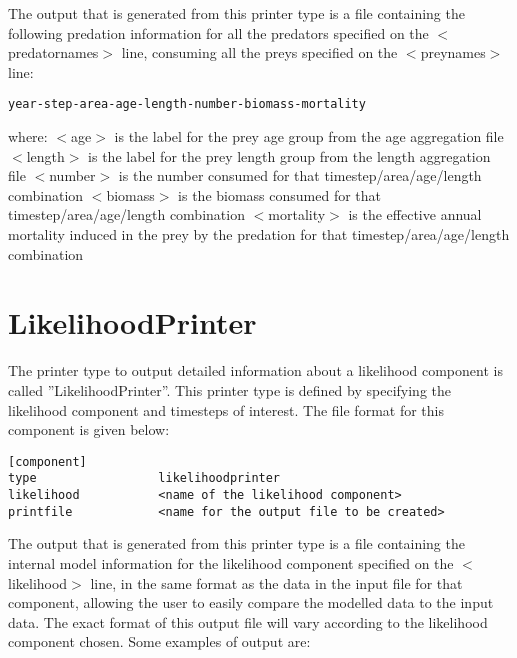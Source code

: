 \documentclass[10pt,twoside]{book}
\begin{document}
\bigskip
The output that is generated from this printer type is a file containing the following predation information for all the predators specified on the $<$predatornames$>$ line, consuming all the preys specified on the $<$preynames$>$ line:

{\small\begin{verbatim}
year-step-area-age-length-number-biomass-mortality
\end{verbatim}}

where:\newline
$<$age$>$ is the label for the prey age group from the age aggregation file\newline
$<$length$>$ is the label for the prey length group from the length aggregation file\newline
$<$number$>$ is the number consumed for that timestep/area/age/length combination\newline
$<$biomass$>$ is the biomass consumed for that timestep/area/age/length combination\newline
$<$mortality$>$ is the effective annual mortality induced in the prey by the predation for that timestep/area/age/length combination

\section{LikelihoodPrinter}\label{sec:likelihoodprinter}
The printer type to output detailed information about a likelihood component is called ''LikelihoodPrinter''.  This printer type is defined by specifying the likelihood component and timesteps of interest.  The file format for this component is given below:

{\small\begin{verbatim}
[component]
type                 likelihoodprinter
likelihood           <name of the likelihood component>
printfile            <name for the output file to be created>
\end{verbatim}}

The output that is generated from this printer type is a file containing the internal model information for the likelihood component specified on the $<$likelihood$>$ line, in the same format as the data in the input file for that component, allowing the user to easily compare the modelled data to the input data.  The exact format of this output file will vary according to the likelihood component chosen.  Some examples of output are:
\end{document}
